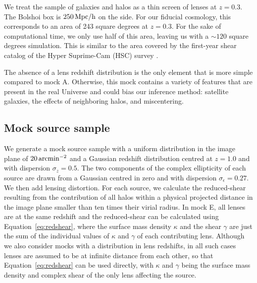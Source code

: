 \documentclass[usenatbib]{mnras}
\def\Eref#1{Equation~\ref{#1}\xspace}
\def\halotools{{\sc Halotools}}
\begin{document}
We treat the sample of galaxies and halos as a thin screen of lenses at $z=0.3$.
The Bolshoi box is $250\,\rm{Mpc}/h$ on the side. For our fiducial cosmology, this corresponds to an area of 243 square degrees at $z=0.3$. For the sake of computational time, we only use half of this area, leaving us with a $\sim120$ square degrees simulation. This is similar to the area covered by the first-year shear catalog of the Hyper Suprime-Cam (HSC) survey \citep{Aih++17, Man++17}.

The absence of a lens redshift distribution is the only element that is more simple compared to mock A.
Otherwise, this mock contains a variety of features that are present in the real Universe and could bias our inference method: satellite galaxies, the effects of neighboring halos, and miscentering.


\subsection{Mock source sample}\label{ssec:wlmock}

We generate a mock source sample with a uniform distribution in the image plane of $20\,\rm{arcmin}^{-2}$ and a Gaussian redshift distribution centred at $z=1.0$ and with dispersion $\sigma_z=0.5$.
The two components of the complex ellipticity of each source are drawn from a Gaussian centred in zero and with dispersion $\sigma_{\epsilon} = 0.27$.
We then add lensing distortion.
For each source, we calculate the reduced-shear resulting from the contribution of all halos within a physical projected distance in the image plane smaller than ten times their virial radius. In mock E, all lenses are at the same redshift and the reduced-shear can be calculated using \Eref{eq:redshear}, where the surface mass density $\kappa$ and the shear $\gamma$ are just the sum of the individual values of $\kappa$ and $\gamma$ of each contributing lens.
Although we also consider mocks with a distribution in lens redshifts, in all such cases lenses are assumed to be at infinite distance from each other, so that \Eref{eq:redshear} can be used directly, with $\kappa$ and $\gamma$ being the surface mass density and complex shear of the only lens affecting the source.
\end{document}
